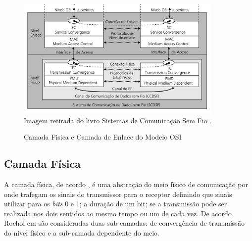 \begin{figure}[ht]
      \begin{center}
            \caption{Camada Física e Camada de Enlace do Modelo OSI}
            \includegraphics[width=10cm]{./sections/textual/chapters/images/modelo_osi_1e2.png}\\
            Imagem retirada do livro Sistemas de Comunicação Sem Fio \cite{rochol2018sistemas}.
            \label{fig:modelo_osi_1e2}
      \end{center}
\end{figure}


\subsection{Camada Física}
A camada física, de acordo \cite{tanembaum2011}, é uma abstração do meio físico de comunicação por onde trafegam os sinais do transmissor para o receptor definindo que sinais utilizar para os \emph{bits} 0 e 1; a duração de um bit; se a transmissão pode ser realizada nos dois sentidos ao mesmo tempo ou um de cada vez. De acordo Rochol em \cite{rochol2018sistemas} são consideradas duas sub-camadas: de convergência de transmissão do nível físico e a sub-camada dependente do meio.

